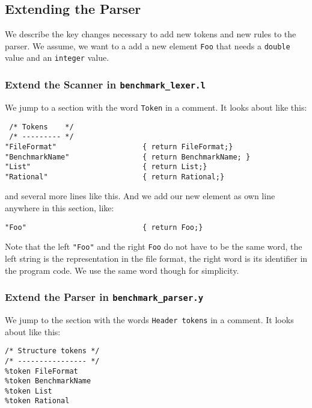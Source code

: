 \subsection{Extending the Parser}
\label{extendall}

We describe the key changes necessary to add new tokens and new rules
to the parser. We assume, we want to a add a new element \texttt{Foo}
that needs a \texttt{double} value and an \texttt{integer} value.

\subsubsection{Extend the Scanner in \texttt{benchmark\_lexer.l}}

We jump to a section with the word \texttt{Token} in a comment. It
looks about like this:

\begin{verbatim}
 /* Tokens    */
 /* --------- */
"FileFormat"                    { return FileFormat;}
"BenchmarkName"                 { return BenchmarkName; }
"List"                          { return List;}
"Rational"                      { return Rational;}
\end{verbatim}

\noindent
and several more lines like this. And we add our new element as own
line anywhere in this section, like:

\begin{verbatim}
"Foo"                           { return Foo;}
\end{verbatim}

\noindent
Note that the left \texttt{"Foo"} and the right \texttt{Foo} do not
have to be the same word, the left string is the representation in the
file format, the right word is its identifier in the program code. We
use the same word though for simplicity.

\subsubsection{Extend the Parser in \texttt{benchmark\_parser.y}}
\label{extend}
We jump to the section with the words \texttt{Header tokens} in a
comment. It looks about like this:

\begin{verbatim}
/* Structure tokens */
/* ---------------- */
%token FileFormat
%token BenchmarkName
%token List
%token Rational
\end{verbatim}

